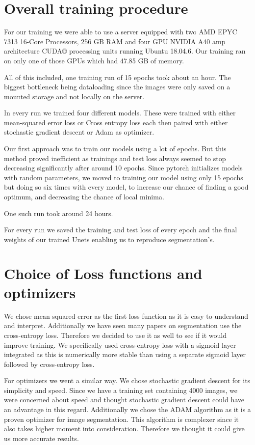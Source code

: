 \section{Overall training procedure}

For our training we were able to use a server equipped with two AMD EPYC 7313 16-Core Processors, 256 GB RAM and four GPU NVIDIA A40 amp architecture CUDA® processing units running Ubuntu 18.04.6.
Our training ran on only one of those GPUs which had 47.85 GB of memory.

All of this included, one training run of 15 epochs took about an hour. The biggest bottleneck being dataloading since the images were only saved on a mounted storage and not locally on the server.

In every run we trained four different models. These were trained with either mean-squared error loss or Cross entropy loss each then paired with either stochastic gradient descent or Adam as optimizer.

Our first approach was to train our models using a lot of epochs. But this method proved inefficient as trainings and test loss always seemed to stop decreasing significantly after around 10 epochs.
Since pytorch initializes models with random parameters, we moved to training our model using only 15 epochs but doing so six times with every model, to increase our chance of finding a good optimum, and decreasing the chance of local minima.

One such run took around 24 hours.

For every run we saved the training and test loss of every epoch and the final weights of our trained Unets enabling us to reproduce segmentation's.

\vspace{3 em}
\section{Choice of Loss functions and optimizers}
We chose mean squared error as the first loss function as it is easy to understand and interpret. Additionally we have seen many papers on segmentation use the cross-entropy loss. 
Therefore we decided to use it as well to see if it would improve training. We specifically used cross-entropy loss with a sigmoid layer integrated as this is numerically more stable than using a separate sigmoid layer followed by cross-entropy loss.

For optimizers we went a similar way. We chose stochastic gradient descent for its simplicity and speed. Since we have a training set containing 4000 images, we were concerned about speed and thought stochastic gradient descent could have an advantage in this regard.
Additionally we chose the ADAM algorithm as it is a proven optimizer for image segmentation. This algorithm is complexer since it also takes higher moment into consideration.
Therefore we thought it could give us more accurate results. 

